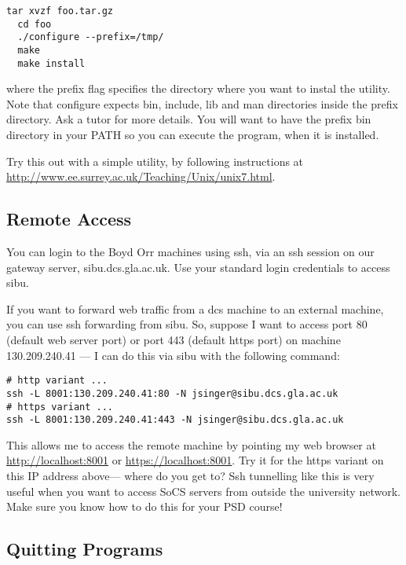 \documentclass{article}
\begin{document}
\begin{lstlisting}[style=BashInputStyle]
  tar xvzf foo.tar.gz
  cd foo
  ./configure --prefix=/tmp/
  make
  make install
\end{lstlisting}

where the prefix flag specifies the directory where you want to instal the utility. Note that configure expects bin, include, lib and man directories inside the prefix directory. Ask a tutor for more details.
You will want to have the prefix bin directory in your PATH so you can execute the program, when it is installed.

Try this out with a simple utility, by following instructions at
\url{http://www.ee.surrey.ac.uk/Teaching/Unix/unix7.html}.

\subsection*{Remote Access}

You can login to the Boyd Orr machines using ssh, via an ssh session
on our gateway server, sibu.dcs.gla.ac.uk.
Use your standard login credentials to access sibu.

If you want to forward web traffic from a dcs machine to an external
machine, you can use ssh forwarding from sibu. So, suppose I want to access port 80 (default web server port) or port 443 (default https port) on machine 130.209.240.41 --- I can do this via sibu with the following command:

\begin{lstlisting}[style=BashInputStyle]
# http variant ...
ssh -L 8001:130.209.240.41:80 -N jsinger@sibu.dcs.gla.ac.uk
# https variant ...
ssh -L 8001:130.209.240.41:443 -N jsinger@sibu.dcs.gla.ac.uk
\end{lstlisting}

This allows me to access the remote machine by pointing my web browser at \url{http://localhost:8001} or \url{https://localhost:8001}. Try it for the https variant on this IP address above--- where do you get to?
Ssh tunnelling like this is very useful
when you want to access SoCS servers from outside the university network. Make sure you know how to do this for your PSD course!

\subsection*{Quitting Programs}
\end{document}
